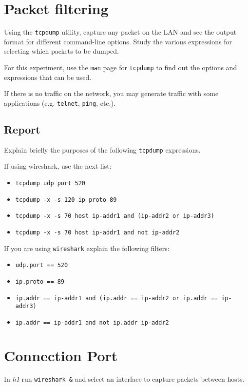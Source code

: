 \documentclass{../UTNetLab}
\begin{document}
\section{Packet filtering}
    Using the \lstinline{tcpdump} utility, capture any packet on the LAN and see the output format
    for different command-line options. Study the various expressions for selecting
    which packets to be dumped.

    For this experiment, use the \lstinline{man} page for \lstinline{tcpdump} to find out the options and
    expressions that can be used.

    If there is no traffic on the network, you may generate traffic with some applications
    (e.g. \lstinline{telnet}, \lstinline{ping}, etc.).
    
    \subsection*{Report}
    Explain briefly the purposes of the following \lstinline{tcpdump} expressions.

    If using wireshark, use the next list:
    \begin{itemize}
        \item \lstinline{tcpdump udp port 520}
        \item \lstinline{tcpdump -x -s 120 ip proto 89}
        \item \lstinline[emph={ip-addr1, ip-addr2, ip-addr3}]{tcpdump -x -s 70 host ip-addr1 and (ip-addr2 or ip-addr3)}
        \item \lstinline[emph={ip-addr1, ip-addr2}]{tcpdump -x -s 70 host ip-addr1 and not ip-addr2}
    \end{itemize}
    
    If you are using \lstinline{wireshark} explain the following filters:
    \begin{itemize}
        \item \lstinline[language=generic]{udp.port == 520}
        \item \lstinline[language=generic]{ip.proto == 89}
        \item \lstinline[emph={ip-addr1, ip-addr2, ip-addr3},language={generic}]{ip.addr == ip-addr1 and (ip.addr == ip-addr2 or ip.addr == ip-addr3)}
        \item \lstinline[emph={ip-addr1, ip-addr2},language={generic}]{ip.addr == ip-addr1 and not ip.addr ip-addr2}
    \end{itemize}

\section{Connection Port}
    In \textit{h1} run \lstinline{wireshark &} and select an interface to capture packets between hosts.
\end{document}
